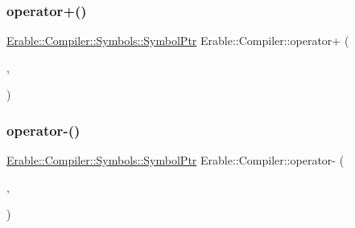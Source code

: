 \subsubsection{\texorpdfstring{operator+()}{operator+()}}
{\footnotesize\ttfamily \mbox{\hyperlink{namespace_erable_1_1_compiler_1_1_symbols_a8f0bc762f448ea4d84e8713ab3e140b9}{Erable\+::\+Compiler\+::\+Symbols\+::\+Symbol\+Ptr}} Erable\+::\+Compiler\+::operator+ (\begin{DoxyParamCaption}\item[{\mbox{\hyperlink{namespace_erable_1_1_compiler_1_1_symbols_a8f0bc762f448ea4d84e8713ab3e140b9}{Erable\+::\+Compiler\+::\+Symbols\+::\+Symbol\+Ptr}}}]{,  }\item[{\mbox{\hyperlink{namespace_erable_1_1_compiler_1_1_symbols_a8f0bc762f448ea4d84e8713ab3e140b9}{Erable\+::\+Compiler\+::\+Symbols\+::\+Symbol\+Ptr}}}]{ }\end{DoxyParamCaption})}

\mbox{\label{namespace_erable_1_1_compiler_aacc636f803005d91d33967aa3701c50d}} 
\subsubsection{\texorpdfstring{operator-\/()}{operator-()}}
{\footnotesize\ttfamily \mbox{\hyperlink{namespace_erable_1_1_compiler_1_1_symbols_a8f0bc762f448ea4d84e8713ab3e140b9}{Erable\+::\+Compiler\+::\+Symbols\+::\+Symbol\+Ptr}} Erable\+::\+Compiler\+::operator-\/ (\begin{DoxyParamCaption}\item[{\mbox{\hyperlink{namespace_erable_1_1_compiler_1_1_symbols_a8f0bc762f448ea4d84e8713ab3e140b9}{Erable\+::\+Compiler\+::\+Symbols\+::\+Symbol\+Ptr}}}]{,  }\item[{\mbox{\hyperlink{namespace_erable_1_1_compiler_1_1_symbols_a63e8157d2f729d4689d27bacad42f8ed}{Erable\+::\+Compiler\+::\+Symbols\+::\+Symbol\+List}}}]{ }\end{DoxyParamCaption})}

\mbox{\label{namespace_erable_1_1_compiler_a2c50de6598a6601138e95a5674740f7a}} 
